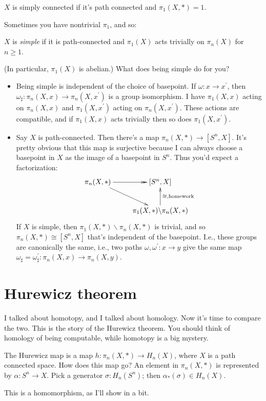 \begin{definition}
    $X$ is simply connected if it's path connected and $\pi_1(X,\ast) = 1$.
\end{definition}
Sometimes you have nontrivial $\pi_1$, and so:
\begin{definition}
    $X$ is \emph{simple} if it is path-connected and $\pi_1(X)$ acts trivially on $\pi_n(X)$ for $n\geq 1$.
\end{definition}
(In particular, $\pi_1(X)$ is abelian.) What does being simple do for you?
\begin{itemize}
    \item Being simple is independent of the choice of basepoint. If $\omega:x\to x^\prime$, then $\omega_\sharp:\pi_n(X,x)\to \pi_n(X,x^\prime)$ is a group isomorphism. I have $\pi_1(X,x)$ acting on $\pi_n(X,x)$ and $\pi_1(X,x^\prime)$ acting on $\pi_n(X,x^\prime)$. These actions are compatible, and if $\pi_1(X,x)$ acts trivially then so does $\pi_1(X,x^\prime)$.
    \item Say $X$ is path-connected. Then there's a map $\pi_n(X,\ast)\to [S^n,X]$. It's pretty obvious that this map is surjective because I can always choose a basepoint in $X$ as the image of a basepoint in $S^n$. Thus you'd expect a factorization:
	\begin{equation*}
	    \xymatrix{
		\pi_n(X,\ast)\ar@{->>}[r]\ar[dr] & [S^n,X]\\
		& \pi_1(X,\ast)\backslash \pi_n(X,\ast)\ar[u]_{\cong,\text{homework}}
		}
	\end{equation*}
	If $X$ is simple, then $\pi_1(X,\ast)\backslash \pi_n(X,\ast)$ is trivial, and so $\pi_n(X,\ast)\cong [S^n,X]$ that's independent of the basepoint. I.e., these groups are canonically the same, i.e., two paths $\omega,\omega^\prime:x\to y$ give the same map $\omega_\sharp = \omega^\prime_\sharp:\pi_n(X,x)\to \pi_n(X,y)$.
\end{itemize}
\section{Hurewicz theorem}
I talked about homotopy, and I talked about homology. Now it's time to compare the two. This is the story of the Hurewicz theorem. You should think of homology of being computable, while homotopy is a big mystery.
\begin{definition}
The Hurewicz map is a map $h:\pi_n(X,\ast)\to H_n(X)$, where $X$ is a path connected space. How does this map go? An element in $\pi_n(X,\ast)$ is represented by $\alpha:S^n\to X$. Pick a generator $\sigma:H_n(S^n)$; then $\alpha_\ast(\sigma)\in H_n(X)$.
\end{definition}
This is a homomorphism, as I'll show in a bit.

